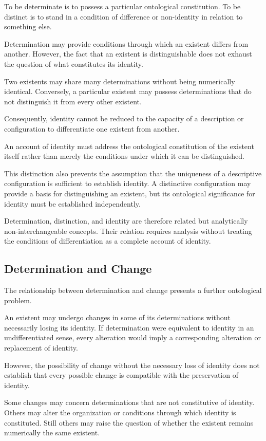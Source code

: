 To be determinate is to possess a particular ontological
constitution. To be distinct is to stand in a condition
of difference or non-identity in relation to something
else.

Determination may provide conditions through which an
existent differs from another. However, the fact that
an existent is distinguishable does not exhaust the
question of what constitutes its identity.

Two existents may share many determinations without
being numerically identical. Conversely, a particular
existent may possess determinations that do not
distinguish it from every other existent.

Consequently, identity cannot be reduced to the capacity
of a description or configuration to differentiate one
existent from another.

An account of identity must address the ontological
constitution of the existent itself rather than merely
the conditions under which it can be distinguished.

This distinction also prevents the assumption that the
uniqueness of a descriptive configuration is sufficient
to establish identity. A distinctive configuration may
provide a basis for distinguishing an existent, but its
ontological significance for identity must be established
independently.

Determination, distinction, and identity are therefore
related but analytically non-interchangeable concepts.
Their relation requires analysis without treating the
conditions of differentiation as a complete account
of identity.

\subsection{Determination and Change}

The relationship between determination and change
presents a further ontological problem.

An existent may undergo changes in some of its
determinations without necessarily losing its identity.
If determination were equivalent to identity in an
undifferentiated sense, every alteration would imply
a corresponding alteration or replacement of identity.

However, the possibility of change without the necessary
loss of identity does not establish that every possible
change is compatible with the preservation of identity.

Some changes may concern determinations that are not
constitutive of identity. Others may alter the organization
or conditions through which identity is constituted.
Still others may raise the question of whether the existent
remains numerically the same existent.

